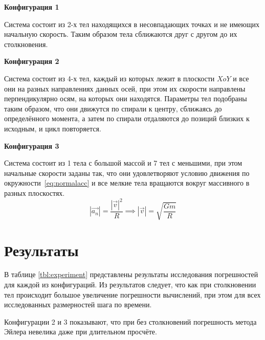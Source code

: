 \textbf{Конфигурация 1}

Система состоит из 2-х тел находящихся в несовпадающих точках и не имеющих начальную скорость. Таким образом тела сближаются друг с другом до их столкновения.

\textbf{Конфигурация 2}

Система состоит из 4-х тел, каждый из которых лежит в плоскости $XoY$ и все они на разных направлениях данных осей, при этом их скорости направлены перпендикулярно осям, на которых они находятся. Параметры тел подобраны таким образом, что они движутся по спирали к центру, сближаясь до определённого момента, а затем по спирали отдаляются до позиций близких к исходным, и цикл повторяется.

\textbf{Конфигурация 3}

Система состоит из 1 тела с большой массой и 7 тел с меньшими, при этом начальные скорости заданы так, что они удовлетворяют условию движения по окружности~\ref{eq:normalacc} и все мелкие тела вращаются вокруг массивного в разных плоскостях. 
\begin{equation}
	\label{eq:normalacc}
	|\vec{a_n}| = \frac{|\vec{v}|^2}{R} \implies |\vec{v}| = \sqrt{\frac{Gm}{R}}
\end{equation}

\section{Результаты}

В таблице \ref{tbl:experiment} представлены результаты исследования погрешностей для каждой из конфигураций. Из результатов следует, что как при столкновении тел происходит большое увеличение погрешности вычислений, при этом для всех исследованных размерностей шага по времени.

Конфигурации 2 и 3 показывают, что при без столкновений погрешность метода Эйлера невелика даже при длительном просчёте.

